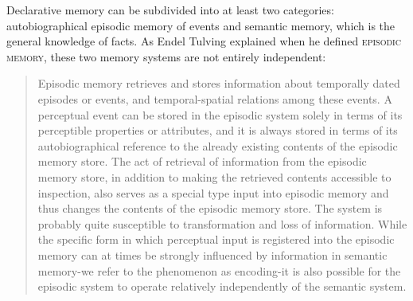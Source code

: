 Declarative memory can be subdivided into at least two categories: autobiographical episodic memory of events and semantic memory, which is the general knowledge of facts.
As Endel Tulving explained when he defined \textsc{episodic memory}, these two memory systems are not entirely independent:


\begin{quote}
Episodic memory retrieves and stores information about temporally dated episodes or events, and temporal-spatial relations among these events. A perceptual event can be stored in the episodic system solely in terms of its perceptible properties or attributes, and it is always stored in terms of its autobiographical reference to the already existing contents of the episodic memory store. The act of retrieval of information from the episodic memory store, in addition to making the retrieved contents accessible to inspection, also serves as a special type input into episodic memory and thus changes the contents of the episodic memory store. The system is probably quite susceptible to transformation and loss of information. While the specific form in which perceptual input is registered into the episodic memory can at times be strongly influenced by information in semantic memory-we refer to the phenomenon as encoding-it is also possible for the episodic system to operate relatively independently of the semantic system.
\end{quote}


